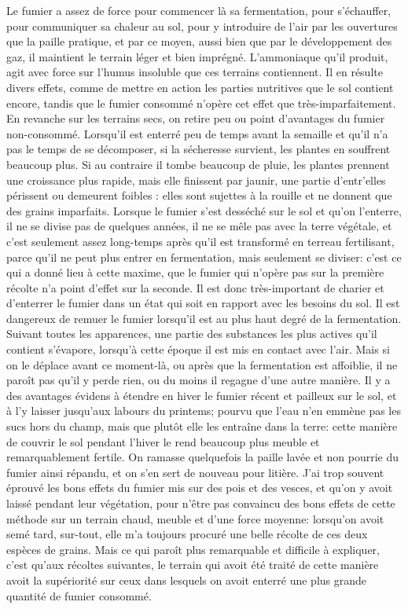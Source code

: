 Le fumier a assez de force pour commencer là sa fermentation, pour s'échauffer, pour communiquer sa chaleur au sol, pour y introduire de l'air par les ouvertures que la paille pratique, et par ce moyen, aussi bien que par le développement des gaz, il maintient le terrain léger et bien imprégné. L'ammoniaque qu'il produit, agit avec force sur l'humus insoluble que ces terrains contiennent. Il en résulte divers effets, comme de mettre en action les parties nutritives que le sol contient encore, tandis que le fumier consommé n'opère cet effet que très-imparfaitement. En revanche sur les terrains secs, on retire peu ou point d'avantages du fumier non-consommé. Lorsqu'il est enterré peu de temps avant la semaille et qu'il n'a pas le temps de se décomposer, si la sécheresse survient, les plantes en souffrent beaucoup plus. Si au contraire il tombe beaucoup de pluie, les plantes prennent une croissance plus rapide, mais elle finissent par jaunir, une partie d'entr'elles périssent ou demeurent foibles : elles sont sujettes à la rouille et ne donnent que des grains imparfaits.
Lorsque le fumier s'est desséché sur le sol et qu'on l'enterre, il ne se divise pas de quelques années, il ne se mêle pas avec la terre\setcounter{page}{312} végétale, et c'est seulement assez long-temps après qu'il est transformé en terreau fertilisant, parce qu'il ne peut plus entrer en fermentation, mais seulement se diviser: c'est ce qui a donné lieu à cette maxime, que le fumier qui n'opère pas sur la première récolte n'a point d'effet sur la seconde. Il est donc très-important de charier et d'enterrer le fumier dans un état qui soit en rapport avec les besoins du sol.
Il est dangereux de remuer le fumier lorsqu'il est au plus haut degré de la fermentation. Suivant toutes les apparences, une partie des substances les plus actives qu'il contient s'évapore, lorsqu'à cette époque il est mis en contact avec l'air. Mais si on le déplace avant ce moment-là, ou après que la fermentation est affoiblie, il ne paroît pas qu'il y perde rien, ou du moins il regagne d'une autre manière.
Il y a des avantages évidens à étendre en hiver le fumier récent et pailleux sur le sol, et à l'y laisser jusqu'aux labours du printems; pourvu que l'eau n'en emmène pas les sucs hors du champ, mais que plutôt elle les entraîne dans la terre: cette manière de couvrir le sol pendant l'hiver le rend beaucoup plus meuble et remarquablement fertile. On ramasse quelquefois la paille lavée et non pourrie du fumier\setcounter{page}{313} ainsi répandu, et on s'en sert de nouveau pour litière. J'ai trop souvent éprouvé les bons effets du fumier mis sur des pois et des vesces, et qu'on y avoit laissé pendant leur végétation, pour n'être pas convaincu des bons effets de cette méthode sur un terrain chaud, meuble et d'une force moyenne: lorsqu'on avoit semé tard, sur-tout, elle m'a toujours procuré une belle récolte de ces deux espèces de grains. Mais ce qui paroît plus remarquable et difficile à expliquer, c'est qu'aux récoltes suivantes, le terrain qui avoit été traité de cette manière avoit la supériorité sur ceux dans lesquels on avoit enterré une plus grande quantité de fumier consommé.
